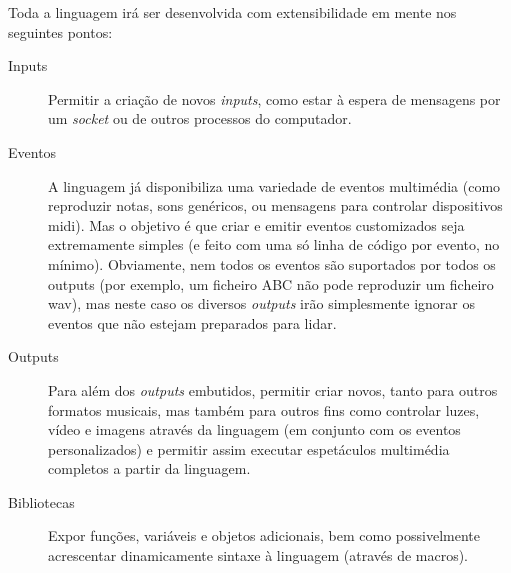 Toda a linguagem irá ser desenvolvida com extensibilidade em mente nos seguintes pontos:
\begin{description}
    \item[Inputs] Permitir a criação de novos \textit{inputs}, como estar à espera de mensagens por um \textit{socket} ou de outros processos do computador.
    \item[Eventos] A linguagem já disponibiliza uma variedade de eventos multimédia (como reproduzir notas, sons genéricos, ou mensagens para controlar dispositivos \acrshort{midi}). Mas o objetivo é que criar e emitir eventos customizados seja extremamente simples (e feito com uma só linha de código por evento, no mínimo). Obviamente, nem todos os eventos são suportados por todos os outputs (por exemplo, um ficheiro ABC não pode reproduzir um ficheiro \acrshort{wav}), mas neste caso os diversos \textit{outputs} irão simplesmente ignorar os eventos que não estejam preparados para lidar.
    \item[Outputs] Para além dos \textit{outputs} embutidos, permitir criar novos, tanto para outros formatos musicais, mas também para outros fins como controlar luzes, vídeo e imagens através da linguagem (em conjunto com os eventos personalizados) e permitir assim executar espetáculos multimédia completos a partir da linguagem.
    \item[Bibliotecas] Expor funções, variáveis e objetos adicionais, bem como possivelmente acrescentar dinamicamente sintaxe à linguagem (através de macros).
\end{description}



